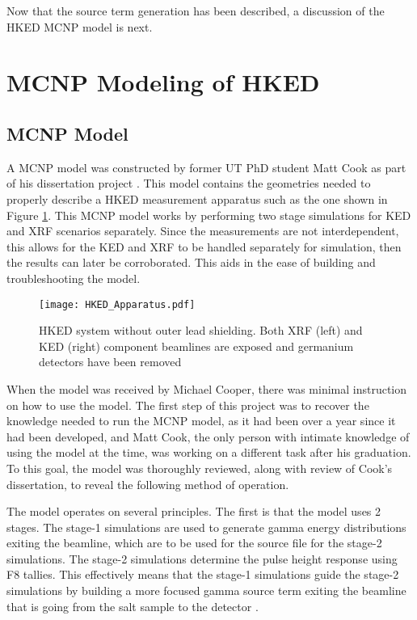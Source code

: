Now that the source term generation has been described, a discussion of the HKED MCNP model is next. \\

\section{MCNP Modeling of HKED}

\subsection{MCNP Model}
A MCNP model was constructed by former UT PhD student Matt Cook as part of his dissertation project \cite{Cook2015}. This model contains the geometries needed to properly describe a HKED measurement apparatus such as the one shown in Figure \ref{HKED-apparatus}. This MCNP model works by performing two stage simulations for KED and XRF scenarios separately. Since the measurements are not interdependent, this allows for the KED and XRF to be handled separately for simulation, then the results can later be corroborated. This aids in the ease of building and troubleshooting the model.


\begin{figure}[h]
  \centering
  \texttt{[image: HKED\_Apparatus.pdf]}
  \caption{HKED system without outer lead shielding. Both XRF (left) and KED (right) component beamlines are exposed and germanium detectors have been removed \cite{Cook2015}}
 \label{HKED-apparatus}
\end{figure} 


When the model was received by Michael Cooper, there was minimal instruction on how to use the model.  The first step of this project was to recover the knowledge needed to run the MCNP model, as it had been over a year since it had been developed, and Matt Cook, the only person with intimate knowledge of using the model at the time, was working on a different task after his graduation. To this goal, the model was thoroughly reviewed, along with review of Cook's dissertation, to reveal the following method of operation. 

The model operates on several principles. The first is that the model uses 2 stages. The stage-1 simulations are used to generate gamma energy distributions exiting the beamline, which are to be used for the source file for the stage-2 simulations. The stage-2 simulations determine the pulse height response using F8 tallies. This effectively means that the stage-1 simulations guide the stage-2 simulations by building a more focused gamma source term  exiting the beamline that is going from the salt sample to the detector \cite{Cook2015}.  %

